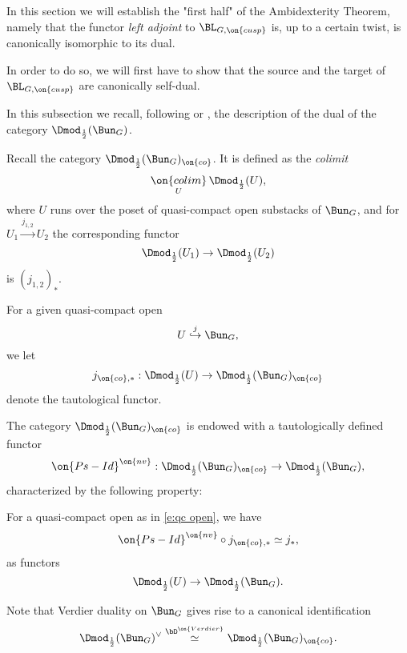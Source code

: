 \documentclass[9pt]{amsart}
\theoremstyle{remark}
\theoremstyle{definition}
\theoremstyle{remark}
\numberwithin{equation}{section}
\begin{document}
In this section we will establish the "first half" of the Ambidexterity Theorem, namely that the functor \emph{left adjoint}
to $\BL_{G,\on{cusp}}$ is, up to a certain twist, is canonically isomorphic to its dual. 

\medskip

In order to do so, we will first have to show that the source and the target of $\BL_{G,\on{cusp}}$ are canonically self-dual. 

 \label{ss:autom co}

In this subsection we recall, following \cite{DG} or \cite{Ga1}, the description of the dual of the category $\Dmod_{\frac{1}{2}}(\Bun_G)$. 

\sssec{}

Recall the category $\Dmod_{\frac{1}{2}}(\Bun_G)_{\on{co}}$. It is defined as the \emph{colimit} 
$$\underset{U}{\on{colim}}\, \Dmod_{\frac{1}{2}}(U),$$
where $U$ runs over the poset of quasi-compact open substacks of $\Bun_G$, and for
$U_1\overset{j_{1,2}}\to U_2$
the corresponding functor 
$$\Dmod_{\frac{1}{2}}(U_1)\to \Dmod_{\frac{1}{2}}(U_2)$$
is $(j_{1,2})_*$.

\medskip

For a given quasi-compact open 
\begin{equation} \label{e:qc open}
U\overset{j}\hookrightarrow \Bun_G,
\end{equation} 
we let
$$j_{\on{co},*}:\Dmod_{\frac{1}{2}}(U)\to \Dmod_{\frac{1}{2}}(\Bun_G)_{\on{co}}$$
denote the tautological functor. 

\sssec{}

The category $\Dmod_{\frac{1}{2}}(\Bun_G)_{\on{co}}$ is endowed with a tautologically defined functor 
$$\on{Ps-Id}^{\on{nv}}:\Dmod_{\frac{1}{2}}(\Bun_G)_{\on{co}}\to \Dmod_{\frac{1}{2}}(\Bun_G),$$
characterized by the following property: 

\medskip

For a quasi-compact open as in \eqref{e:qc open}, we have 
\begin{equation} \label{e:PsId and j}
\on{Ps-Id}^{\on{nv}}\circ j_{\on{co},*}\simeq j_*,
\end{equation}
as functors 
$$\Dmod_{\frac{1}{2}}(U)\to \Dmod_{\frac{1}{2}}(\Bun_G).$$

\sssec{}

Note that Verdier duality on $\Bun_G$ gives rise to a canonical identification 
\begin{equation} \label{e:Verdier on Bun}
\Dmod_{\frac{1}{2}}(\Bun_G)^\vee \overset{\bD^{\on{Verdier}}}\simeq \Dmod_{\frac{1}{2}}(\Bun_G)_{\on{co}}.
\end{equation} 
\end{document}
